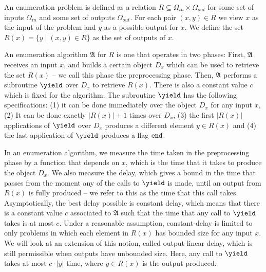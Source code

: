 
An enumeration problem is defined as a relation $R\subseteq \Omega_{in} \times \Omega_{out}$ for some set of inputs $\Omega_{in}$ and some set of outputs $\Omega_{out}$.
For each pair $(x, y)\in R$ we view $x$ as the input of the problem and $y$ as a possible output for $x$.
We define the set $R(x) = \{y\mid(x, y)\in R\}$ as the set of outputs of $x$.

An enumeration algorithm $\mathfrak{A}$ for $R$ is one that operates in two phases: First, $\mathfrak{A}$ receives an input $x$, and builds a certain object $D_x$ which can be used to retrieve the set $R(x)$ -- we call this phase the preprocessing phase. Then, $\mathfrak{A}$ performs a subroutine $\yield$ over $D_x$ to retrieve $R(x)$. There is also a constant value $c$ which is fixed for the algorithm. The subroutine $\yield$ has the following specifications: (1) it can be done immediately over the object $D_x$ for any input $x$, (2) It can be done exactly $|R(x)|+1$ times over $D_x$, (3) the first $|R(x)|$ applications of $\yield$ over $D_x$ produces a different element $y\in R(x)$ and (4) the last application of $\yield$ produces a flag ${\tt end}$.

In an enumeration algorithm, we measure the time taken in the preprocessing phase by a function that depends on $x$, which is the time that it takes to produce the object $D_x$. 
We also measure the delay, which gives a bound in the time that passes from the moment any of the calls to $\yield$ is made, until an output from $R(x)$ is fully produced -- we refer to this as the time that this call takes.
Asymptotically, the best delay possible is constant delay, which means that there is a constant value $c$ associated to $\mathfrak{A}$ such that the time that any call to $\yield$ takes is at most $c$. Under a reasonable assumption, constant-delay is limited to only problems in which each element in $R(x)$ has bounded size for any input $x$. We will look at an extension of this notion, called output-linear delay, which is still permissible when outputs have unbounded size. Here, any call to $\yield$ takes at most $c\cdot|y|$ time, where $y\in R(x)$ is the output produced.


